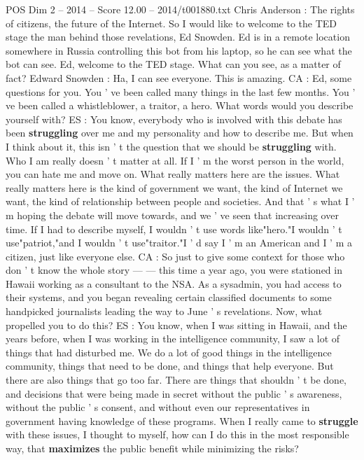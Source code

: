 \begin{textsample}{POS Dim 2 – 2014 – Score 12.00 – 2014/t001880.txt}  \label{ex:f2_pos_061}
Chris Anderson : The rights of citizens, the future of the Internet.
So I would like to welcome to the TED stage the man behind those revelations, Ed Snowden.
Ed is in a remote location somewhere in Russia controlling this bot from his laptop, so he can see what the bot can see.
Ed, welcome to the TED stage.
What can you see, as a matter of fact?
Edward Snowden : Ha, I can see everyone.
This is amazing.
CA : Ed, some questions for you.
You ' ve been called many things in the last few months.
You ' ve been called a whistleblower, a traitor, a hero.
What words would you describe yourself with?
ES : You know, everybody who is involved with this debate has been \textbf{struggling} over me and my personality and how to describe me.
But when I think about it, this isn ' t the question that we should be \textbf{struggling} with.
Who I am really doesn ' t matter at all.
If I ' m the worst person in the world, you can hate me and move on.
What really matters here are the issues.
What really matters here is the kind of government we want, the kind of Internet we want, the kind of relationship between people and societies.
And that ' s what I ' m hoping the debate will move towards, and we ' ve seen that increasing over time.
If I had to describe myself, I wouldn ' t use words like"hero."I wouldn ' t use"patriot,"and I wouldn ' t use"traitor."I ' d say I ' m an American and I ' m a citizen, just like everyone else.
CA : So just to give some context for those who don ' t know the whole story — — this time a year ago, you were stationed in Hawaii working as a consultant to the NSA.
As a sysadmin, you had access to their systems, and you began revealing certain classified documents to some handpicked journalists leading the way to June ' s revelations.
Now, what propelled you to do this?
ES : You know, when I was sitting in Hawaii, and the years before, when I was working in the intelligence community, I saw a lot of things that had disturbed me.
We do a lot of good things in the intelligence community, things that need to be done, and things that help everyone.
But there are also things that go too far.
There are things that shouldn ' t be done, and decisions that were being made in secret without the public ' s awareness, without the public ' s consent, and without even our representatives in government having knowledge of these programs.
When I really came to \textbf{struggle} with these issues, I thought to myself, how can I do this in the most responsible way, that \textbf{maximizes} the public benefit while minimizing the risks?

\end{textsample}
